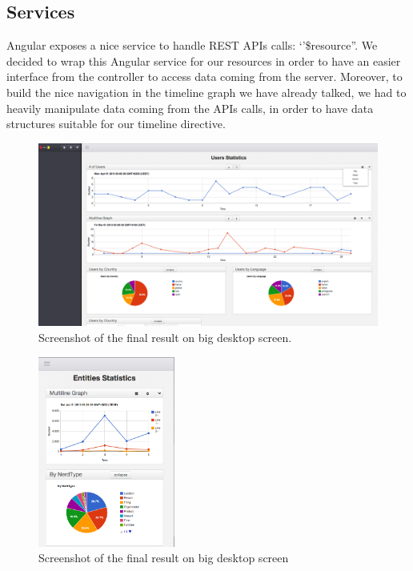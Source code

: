 \documentclass[a4paper,13pt]{report}
\begin{document}
\subsection{Services} %
\label{sub:services}
Angular exposes a nice service to handle REST APIs calls: `'\$resource''.
We decided to wrap this Angular service for our resources in order to have an easier interface from the controller to access data coming from the server.
Moreover, to build the nice navigation in the timeline graph we have already talked, we had to heavily manipulate data coming from the APIs calls, in order to have data structures suitable for our timeline directive.
\begin{figure}[H]
  \caption{Screenshot of the final result on big desktop screen.}
  \centering
    \includegraphics[width=1\textwidth]{pics/proto/fullDesktop}
\end{figure}
\begin{figure}[H]
  \caption{Screenshot of the final result on big desktop screen}
  \centering
    \includegraphics[width=0.4\textwidth]{pics/proto/fullMobile}
\end{figure}
\label{sub:subsection_name}
\end{document}
